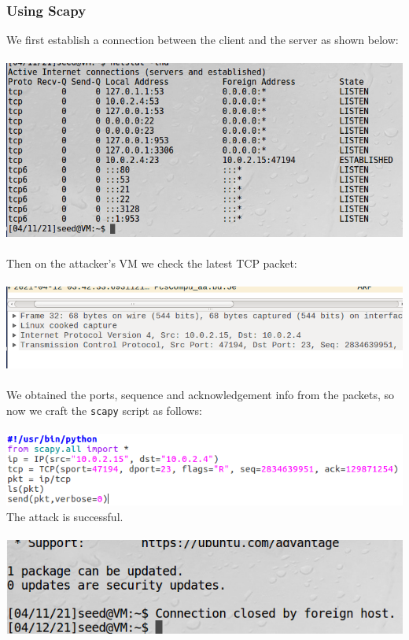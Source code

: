 \documentclass[a4paper]{article}
\begin{document}
\subsubsection{Using Scapy}
We first establish a connection between the client and the server as shown below:\\\\
\includegraphics[scale=0.7]{1/15.png}\\\\
Then on the attacker's VM we check the latest TCP packet:\\\\
\includegraphics[scale=0.7]{1/16.png}\\\\
We obtained the ports, sequence and acknowledgement info from the packets, so now we craft the \verb+scapy+ script as follows:\\\\
\pagebreak
\includegraphics[scale=0.7]{1/17.png}
\\The attack is successful.\\\\
\includegraphics[scale=0.7]{1/18.png}\\\\
\end{document}
